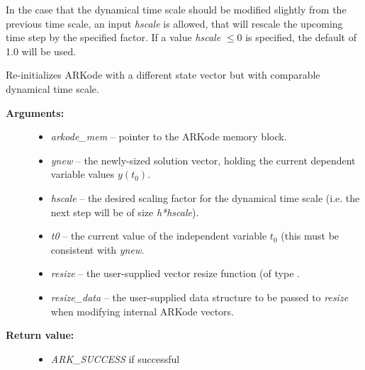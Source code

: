 \documentclass[letterpaper,10pt,english]{sphinxmanual}
\begin{document}
In the case that the dynamical time scale should be modified slightly
from the previous time scale, an input \emph{hscale} is allowed, that will
rescale the upcoming time step by the specified factor.  If a value
\emph{hscale} $\le 0$ is specified, the default of 1.0 will be used.

\begin{fulllineitems}
\label{c_interface/User_callable:ARKodeResize}
Re-initializes ARKode with a different state vector but with
comparable dynamical time scale.
\begin{description}
\item[{\textbf{Arguments:}}] \leavevmode\begin{itemize}
\item {} 
\emph{arkode\_mem} -- pointer to the ARKode memory block.

\item {} 
\emph{ynew} -- the newly-sized solution vector, holding the current
dependent variable values $y(t_0)$.

\item {} 
\emph{hscale} -- the desired scaling factor for the dynamical time
scale (i.e. the next step will be of size \emph{h*hscale}).

\item {} 
\emph{t0} -- the current value of the independent variable
$t_0$ (this must be consistent with \emph{ynew}.

\item {} 
\emph{resize} -- the user-supplied vector resize function (of type
{\hyperref[c_interface/User_supplied:ARKVecResizeFn]{}}.

\item {} 
\emph{resize\_data} -- the user-supplied data structure to be passed
to \emph{resize} when modifying internal ARKode vectors.

\end{itemize}

\item[{\textbf{Return value:}}] \leavevmode\begin{itemize}
\item {} 
\emph{ARK\_SUCCESS} if successful


\end{itemize}
\end{description}
\end{fulllineitems}
\end{document}
